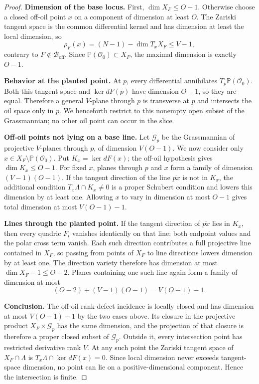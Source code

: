 \documentclass[11pt,a4paper]{article}
\theoremstyle{definition}
\theoremstyle{remark}
\newcommand{\PP}{\mathbb P}
\newcommand{\cO}{\mathcal O}
\newcommand{\cB}{\mathcal B}
\newcommand{\off}{\mathrm{off}}
\newcommand{\proofstep}[1]{\par\smallskip\noindent\textbf{#1}\enspace}
\begin{document}
\begin{proof}
\proofstep{Dimension of the base locus.}
First, $\dim X_F\le O-1$.  Otherwise choose a closed off-oil point $x$ on a component of dimension at least $O$.  The Zariski tangent space is the common differential kernel and has dimension at least the local dimension, so
\[
\rho_F(x)=(N-1)-\dim T_xX_F\le V-1,
\]
contrary to $F\notin\cB_{\off}$.  Since $\PP(\cO_0)\subset X_F$, the maximal dimension is exactly $O-1$.

\proofstep{Behavior at the planted point.}
At $p$, every differential annihilates $T_p\PP(\cO_0)$.  Both this tangent space and $\ker dF(p)$ have dimension $O-1$, so they are equal.  Therefore a general $V$-plane through $p$ is transverse at $p$ and intersects the oil space only in $p$.  We henceforth restrict to this nonempty open subset of the Grassmannian; no other oil point can occur in the slice.

\proofstep{Off-oil points not lying on a base line.}
Let $\mathcal G_p$ be the Grassmannian of projective $V$-planes through $p$, of dimension $V(O-1)$.  We now consider only $x\in X_F\setminus\PP(\cO_0)$.  Put $K_x=\ker dF(x)$; the off-oil hypothesis gives $\dim K_x\le O-1$.  For fixed $x$, planes through $p$ and $x$ form a family of dimension $(V-1)(O-1)$.  If the tangent direction of the line $\overline{px}$ is not in $K_x$, the additional condition $T_x\Lambda\cap K_x\ne0$ is a proper Schubert condition and lowers this dimension by at least one.  Allowing $x$ to vary in dimension at most $O-1$ gives total dimension at most $V(O-1)-1$.

\proofstep{Lines through the planted point.}
If the tangent direction of $\overline{px}$ lies in $K_x$, then every quadric $F_i$ vanishes identically on that line: both endpoint values and the polar cross term vanish.  Each such direction contributes a full projective line contained in $X_F$, so passing from points of $X_F$ to line directions lowers dimension by at least one.  The direction variety therefore has dimension at most $\dim X_F-1\le O-2$.  Planes containing one such line again form a family of dimension at most
\[
(O-2)+(V-1)(O-1)=V(O-1)-1.
\]
\proofstep{Conclusion.}
The off-oil rank-defect incidence is locally closed and has dimension at most $V(O-1)-1$ by the two cases above.  Its closure in the projective product $X_F\times\mathcal G_p$ has the same dimension, and the projection of that closure is therefore a proper closed subset of $\mathcal G_p$.  Outside it, every intersection point has restricted derivative rank $V$.  At any such point the Zariski tangent space of $X_F\cap\Lambda$ is $T_x\Lambda\cap\ker dF(x)=0$.  Since local dimension never exceeds tangent-space dimension, no point can lie on a positive-dimensional component.  Hence the intersection is finite.
\end{proof}
\end{document}
